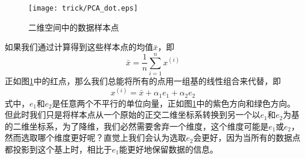 \begin{figure}[!htbp]
\centering
\texttt{[image: trick/PCA\_dot.eps]}
\caption{二维空间中的数据样本点}
\label{img:PCA dot}
\end{figure}

如果我们通过计算得到这些样本点的均值$\bar{x}$，即
\begin{equation}
\bar{x} = \frac{1}{n}\sum\limits_{i=1}^n x^{(i)}
\end{equation}
正如图\ref{img:PCA dot}中的红点，那么我们总能将所有的点用一组基的线性组合来代替，即
\begin{equation}
x^{(i)} = \bar{x} + \alpha_1 e_1 + \alpha_2 e_2
\end{equation}
式中，$e_1$和$e_2$是任意两个不平行的单位向量，正如图\ref{img:PCA dot}中的紫色方向和绿色方向。但此时我们只是将样本点从一个原始的正交二维坐标系转换到另一个以$e_1$和$e_2$为基的二维坐标系，为了降维，我们必然需要舍弃一个维度，这个维度可能是$e_1$或$e_2$，然而选取哪个维度更好呢？直觉上我们会认为选取$e_2$会更好，因为当所有的数据点都投影到这个基上时，相比于$e_1$能更好地保留数据的信息。

